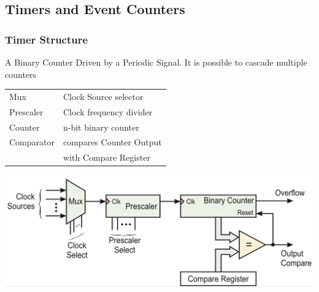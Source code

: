 \clearpage

\subsection{Timers and Event Counters }
\subsubsection{Timer Structure}
A Binary Counter Driven by a Periodic Signal. It is possible to cascade multiple counters\\
\vspace{1cm}
\begin{minipage}{0.5\linewidth}
	\begin{tabular}{ll}
		Mux           & Clock Source selector \\
		Prescaler     & Clock frequency divider \\
		Counter       & n-bit binary counter \\
		Comparator    & compares Counter Output\\
                      &  with Compare Register
	\end{tabular}
\end{minipage}
\begin{minipage}{0.5\linewidth}
	\includegraphics[width=\linewidth]{images/timerstructure.png} 
\end{minipage}

